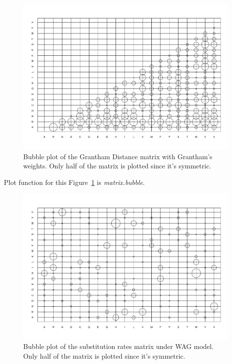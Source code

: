 \documentclass[12pt]{article}
\begin{document}
\begin{figure}[h]
\includegraphics[width=\textwidth]{GranthamMatrix.pdf}
\caption{Bubble plot of the Grantham Distance matrix with Grantham's weights. Only half of the matrix is plotted since it's symmetric.}
\label{fig:GranthamDis}
\end{figure}
Plot function for this Figure~\ref{fig:GranthamDis} is {\it matrix.bubble}.

\begin{figure}[h]
\includegraphics[width=\textwidth]{WAG_submat.pdf}
\caption{Bubble plot of the substitution rates matrix under WAG model. Only half of the matrix is plotted since it's symmetric.}
\label{fig:WAGmat}
\end{figure}
\end{document}
